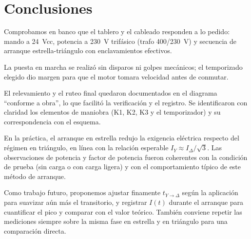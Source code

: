 
\section{Conclusiones}
Comprobamos en banco que el tablero y el cableado responden a lo pedido: mando a 24~Vcc, potencia a 230~V trifásico (trafo 400/230~V) y secuencia de arranque estrella-triángulo con enclavamientos efectivos.

La puesta en marcha se realizó sin disparos ni golpes mecánicos; el temporizado elegido dio margen para que el motor tomara velocidad antes de conmutar.

El relevamiento y el ruteo final quedaron documentados en el diagrama ``conforme a obra'', lo que facilitó la verificación y el registro. Se identificaron con claridad los elementos de maniobra (K1, K2, K3 y el temporizador) y su correspondencia con el esquema.

En la práctica, el arranque en estrella redujo la exigencia eléctrica respecto del régimen en triángulo, en línea con la relación esperable $I_Y \approx I_\Delta/\sqrt{3}$. Las observaciones de potencia y factor de potencia fueron coherentes con la condición de prueba (sin carga o con carga ligera) y con el comportamiento típico de este método de arranque.

Como trabajo futuro, proponemos ajustar finamente $t_{Y\to\Delta}$ según la aplicación para suavizar aún más el transitorio, y registrar $I(t)$ durante el arranque para cuantificar el pico y comparar con el valor teórico. También conviene repetir las mediciones siempre sobre la misma fase en estrella y en triángulo para una comparación directa.
